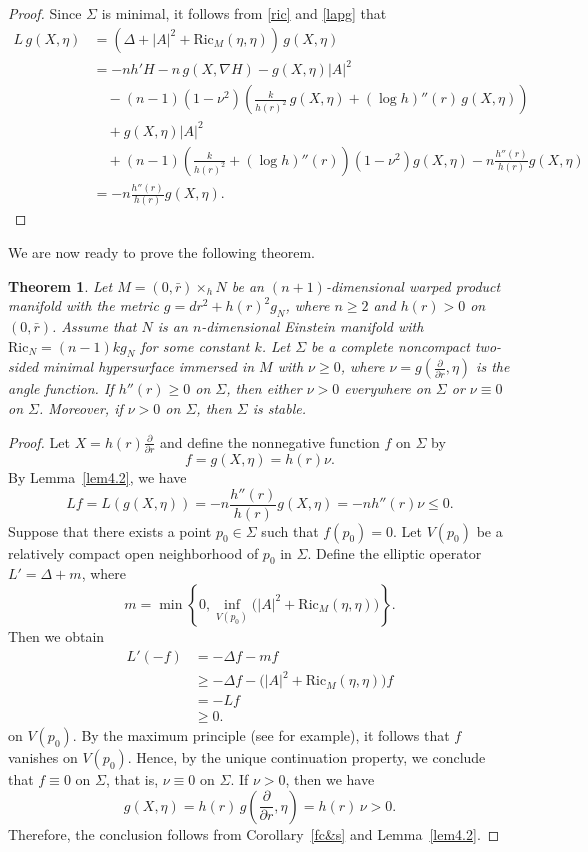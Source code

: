 \documentclass[amssymb,amstex,amsmath,11pt]{article}
\numberwithin{equation}{section}
\theoremstyle{plain}
\newtheorem{thm}{Theorem}[section]
\theoremstyle{definition}
\theoremstyle{remark}
\newcommand{\lap}{\Delta}
\def\Ricm{\textrm{Ric}_M}
\begin{document}
\begin{proof}
Since $\Sigma$ is minimal, it follows from \eqref{ric} and \eqref{lapg} that
    \begin{align*}
        L\,g(X,\eta) & = \left(\lap + |A|^2 + \Ricm(\eta,\eta)\right)\,g(X,\eta)\nonumber \\
        & = -nh'H - n \, g(X,\nabla H) - g(X,\eta)|A|^2 \nonumber \\
        & \quad - (n-1)(1-\nu^2)\left(\frac{k}{h(r)^2} \, g(X,\eta) + (\log h)''(r) \, g(X,\eta)\right) \nonumber \\
        & \quad + g(X,\eta)|A|^2 \nonumber \\
        & \quad + (n-1)\left(\frac{k}{h(r)^2} + (\log h)''(r)\right)(1-\nu^2)g(X,\eta) - n\frac{h''(r)}{h(r)}g(X,\eta) \nonumber\\
        & =-n\frac{h''(r)}{h(r)}g(X,\eta).
    \end{align*}
\end{proof}
We are now ready to prove the following theorem.

\begin{thm} \label{thmw}
Let $M=(0,\bar{r})\times_h N$ be an $(n+1)$-dimensional  warped product manifold with the metric $g=dr^2+h(r)^2g_N$, where $n\ge 2$ and $h(r)>0$ on $(0,\bar{r})$. Assume that $N$ is an $n$-dimensional Einstein manifold with $\mathrm{Ric}_N = (n-1)k g_N$ for some constant $k$. Let $\Sigma$ be a complete noncompact two-sided minimal hypersurface immersed in $M$ with $\nu\geq0$, where $\nu=g\!\left(\frac{\partial}{\partial r},\eta\right)$ is the angle function. If $h''(r)\geq0$ on $\Sigma$, then either $\nu>0$ everywhere on $\Sigma$ or $\nu\equiv 0$ on $\Sigma$. Moreover, if $\nu>0$ on $\Sigma$, then $\Sigma$ is stable.
\end{thm}


\begin{proof}
 Let $X=h(r)\frac{\partial}{\partial r}$ and define the nonnegative function $f$ on $\Sigma$  by
$$
f=g(X,\eta)=h(r)\nu.
$$
By Lemma~\ref{lem4.2}, we have
$$
Lf=L(g(X,\eta))=-n\frac{h''(r)}{h(r)}g(X,\eta)=-nh''(r)\nu\le 0.
$$
Suppose that there exists a point $p_0\in\Sigma$ such that $f(p_0)=0$. Let $V(p_0)$ be a relatively compact open neighborhood of $p_0$ in $\Sigma$. Define the elliptic operator $L'=\lap+m$, where
$$
m=\min\left\{0,\inf_{V(p_0)}\bigl(|A|^2+\Ricm(\eta,\eta)\bigr)\right\}.
$$
Then we obtain
\begin{align*}
L'(-f)
&= -\lap f-mf \\
&\ge -\lap f-\bigl(|A|^2+\Ricm(\eta,\eta)\bigr)f \\
&= -Lf \\
&\ge 0.
\end{align*}
on $V(p_0)$. 
By the maximum principle (see \cite{G&T01} for example), it follows that $f$ vanishes on $V(p_0)$. Hence, by the unique continuation property, we conclude that $f \equiv 0$ on $\Sigma$, that is, $\nu \equiv 0$ on $\Sigma$. If $\nu>0$, then we have
$$
g(X,\eta)=h(r)\,g\left(\frac{\partial}{\partial r},\eta\right)=h(r)\,\nu>0.
$$
Therefore, the conclusion follows from Corollary~\ref{fc&s} and Lemma~\ref{lem4.2}.
\end{proof}
\end{document}
